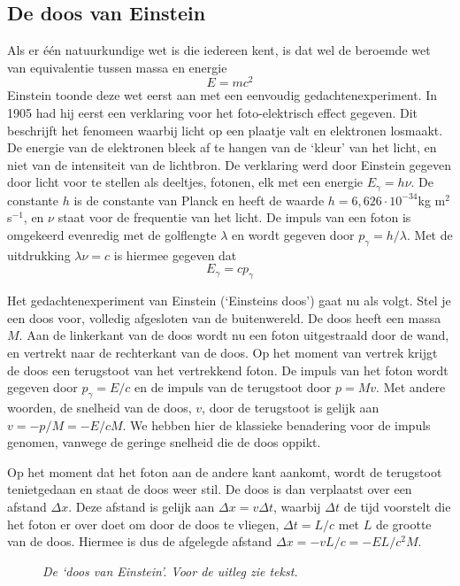 \subsection{De doos van Einstein}
Als er \'e\'en natuurkundige wet is die iedereen kent, is dat wel de beroemde wet van equivalentie 
tussen massa en energie
\begin{equation}
E= m c^2
\end{equation}
Einstein toonde deze wet eerst aan met een eenvoudig
gedachtenexperiment. In 1905 had hij eerst een verklaring voor het
foto-elektrisch effect gegeven. Dit beschrijft het fenomeen waarbij
licht op een plaatje valt en elektronen losmaakt. De energie van de
elektronen bleek af te hangen van de `kleur' van het licht, en niet
van de intensiteit van de lichtbron. De verklaring werd door Einstein
gegeven door licht voor te stellen als deeltjes, fotonen, elk met een
energie $E_{\gamma} = h \nu$. De constante $h$ is de constante van
Planck en heeft de waarde $h=6,626\cdot 10^{-34} $kg m$^2$ s$^{-1}$, en
$\nu$ staat voor de frequentie van het licht. De impuls van een foton
is omgekeerd evenredig met de golflengte $\lambda$ en wordt gegeven
door $p_{\gamma}=h/\lambda$. Met de uitdrukking $\lambda \nu = c$ is
hiermee gegeven dat
\[
E_{\gamma} = c p_{\gamma}
\]

Het gedachtenexperiment van Einstein (`Einsteins doos') gaat nu als
volgt. Stel je een doos voor, volledig afgesloten van de
buitenwereld. De doos heeft een massa $M$. Aan de linkerkant van de
doos wordt nu een foton uitgestraald door de wand, en vertrekt naar de
rechterkant van de doos. Op het moment van vertrek krijgt de doos een
terugstoot van het vertrekkend foton. De impuls van het foton
wordt gegeven door $p_{\gamma}=E/c$ en de impuls van de terugstoot
door $p=Mv$. Met andere woorden, de snelheid van de doos, $v$, door de terugstoot is gelijk aan
$v=-p/M = -E/ cM$. We hebben hier de klassieke benadering voor de impuls genomen, vanwege de geringe snelheid die de doos oppikt.


Op het moment dat het foton aan de andere kant aankomt, wordt de
terugstoot tenietgedaan en staat de doos weer stil. De doos is dan
verplaatst over een afstand $\Delta x$. Deze afstand is gelijk aan $\Delta x=v \Delta t$,
waarbij $\Delta t$ de tijd voorstelt die het foton er over doet om door de
doos te vliegen, $\Delta t = L/c$ met $L$ de grootte van de doos.
Hiermee is dus de afgelegde afstand $\Delta x=-vL/c = -EL/c^2 M$. 

\begin{figure}[ht] 
\centering
\caption{{\sl De `doos van Einstein'. Voor de uitleg zie tekst.
\label{f:bots4}}}
\end{figure}


